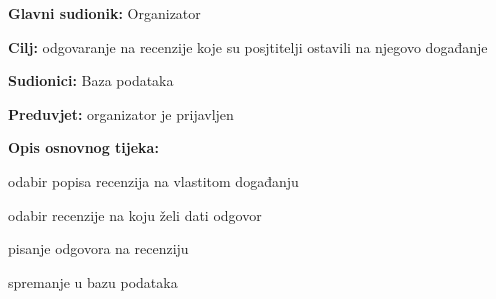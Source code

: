 					\noindent {}
					\begin{packed_item}
	
						\item \textbf{Glavni sudionik: }Organizator
						\item  \textbf{Cilj:} odgovaranje na recenzije koje su posjtitelji ostavili na njegovo događanje
						\item  \textbf{Sudionici:} Baza podataka
						\item  \textbf{Preduvjet:} organizator je prijavljen
						\item  \textbf{Opis osnovnog tijeka:}
						
						\item[] \begin{packed_enum}
	
							\item odabir popisa recenzija na vlastitom događanju 
							\item odabir recenzije na koju želi dati odgovor
							\item pisanje odgovora na recenziju 
							\item spremanje u bazu podataka
							
						\end{packed_enum}

					\end{packed_item}
					
